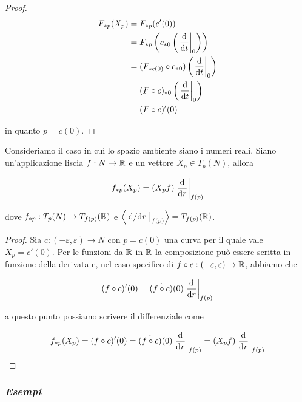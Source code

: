\begin{proof}
	\begin{align}
		\begin{split}
			F_{*p}(X_{p}) &= F_{*p}(c'(0))\\
			&= F_{*p} \left( c_{*0} \left( \eval{ \dv{t} }_{0} \right) \right)\\
			&= (F_{*c(0)} \circ c_{*0}) \left( \eval{ \dv{t} }_{0} \right)\\
			&= (F \circ c)_{*0} \left( \eval{ \dv{t} }_{0} \right)\\
			&= (F \circ c)' (0)
		\end{split}
	\end{align}

	in quanto $ p = c(0) $.
\end{proof}

\begin{corollary}
	Consideriamo il caso in cui lo spazio ambiente siano i numeri reali. Siano un'applicazione liscia $ f : N \to \mathbb{R} $ e un vettore $ X_{p} \in T_{p}(N) $, allora
	
	\begin{equation}
		f_{*p}(X_{p}) = (X_{p} f) \eval{ \dv{r} }_{f(p)}
	\end{equation}

	dove $ f_{*p} : T_{p}(N) \to T_{f(p)}(\mathbb{R}) $ e $ \ev{ \eval{ \dv*{r} }_{f(p)} } = T_{f(p)}(\R) $.
\end{corollary}

\begin{proof}
	Sia $ c : (-\varepsilon,\varepsilon) \to N $ con $ p = c(0) $ una curva per il quale vale $ X_{p} = c'(0) $. Per le funzioni da $ \mathbb{R} $ in $ \mathbb{R} $ la composizione può essere scritta in funzione della derivata e, nel caso specifico di $ f \circ c : (-\varepsilon,\varepsilon) \to \mathbb{R} $, abbiamo che
	
	\begin{equation}
		(f \circ c)'(0) = \dot{(f \circ c)}(0) \eval{ \dv{r} }_{f(p)}
	\end{equation}

	a questo punto possiamo scrivere il differenziale come
	
	\begin{equation}
		f_{*p}(X_{p}) = (f \circ c)' (0) %
		= \dot{(f \circ c)}(0) \eval{ \dv{r} }_{f(p)} %
		= (X_{p} f) \eval{ \dv{r} }_{f(p)}
	\end{equation}
\end{proof}

\subsubsection{\textit{Esempi}}

